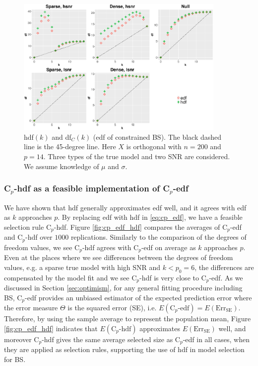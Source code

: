 \begin{figure}[!ht]
	\centering
	\includegraphics[width=0.9\textwidth]{figures/hdf_edf_bs.eps}
	\caption{hdf$(k)$ and df$_C(k)$ (edf of constrained BS). The black dashed line is the 45-degree line. Here $X$ is orthogonal with $n=200$ and $p=14$. Three types of the true model and two SNR are considered. We assume knowledge of $\mu$ and $\sigma$.}
	\label{fig:dfc_dflambda}
\end{figure}



\subsubsection{\texorpdfstring{C$_p$}{Lg}-hdf as a feasible implementation of \texorpdfstring{C$_p$}{Lg}-edf }
\label{sec:cp_edf_hdf}
We have shown that hdf generally approximates edf well, and it agrees with edf as $k$ approaches $p$. By replacing edf with hdf in \eqref{eq:cp_edf}, we have a feasible selection rule C$_p$-hdf. Figure \ref{fig:cp_edf_hdf} compares the averages of C$_p$-edf and C$_p$-hdf over $1000$ replications. Similarly to the comparison of the degrees of freedom values, we see C$_p$-hdf agrees with C$_p$-edf on average as $k$ approaches $p$. Even at the places where we see differences between the degrees of freedom values, e.g. a sparse true model with high SNR and $k<p_0=6$, the differences are compensated by the model fit and we see C$_p$-hdf is very close to C$_p$-edf. As we discussed in Section \ref{sec:optimism}, for any general fitting procedure including BS, C$_p$-edf provides an unbiased estimator of the expected prediction error where the error measure $\Theta$ is the squared error (SE), i.e. $E(\text{C}_p\text{-edf}) = E(\text{Err}_{\text{SE}})$. Therefore, by using the sample average to represent the population mean, Figure \ref{fig:cp_edf_hdf} indicates that $E(\text{C}_p\text{-hdf})$ approximates $E(\text{Err}_{\text{SE}})$ well, and moreover C$_p$-hdf gives the same average selected size as C$_p$-edf in all cases, when they are applied as selection rules, supporting the use of hdf in model selection for BS.

